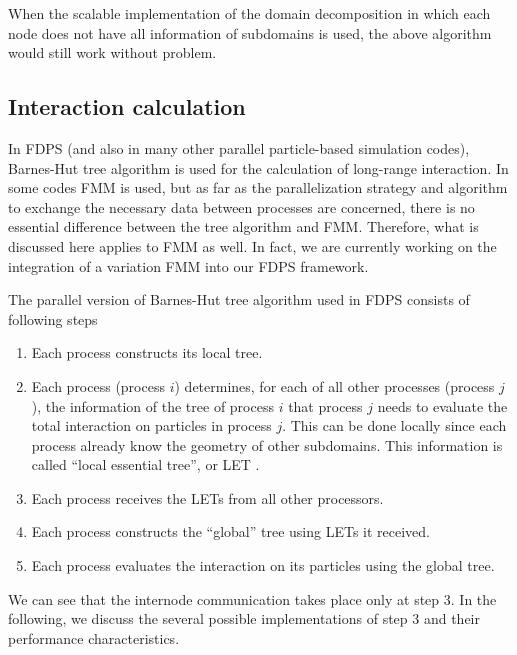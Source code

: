 When the scalable implementation of the domain decomposition in which
each node does not have all information of subdomains is used, the
above algorithm would still work without problem.

\subsection{Interaction calculation}
\label{sect:comm:interaction}

In FDPS (and also in many other parallel particle-based simulation
codes), Barnes-Hut tree algorithm\cite{BarnesHut1986} is used for the
calculation of long-range interaction. In some codes
FMM\cite{GreengardRokhlin1987} is used, but as far as the
parallelization strategy and algorithm to exchange the necessary data
between processes are concerned, there is no essential difference
between the tree algorithm and FMM. Therefore, what is discussed here
applies to FMM as well. In fact, we are currently working on the
integration of a variation FMM into our FDPS framework.

The parallel version of Barnes-Hut tree algorithm used in FDPS
consists of following steps

\begin{enumerate}

\item Each process constructs its local tree.

\item Each process (process $i$) determines, for each of all other
  processes (process $j$),  the information of the tree of  process
  $i$  that process $j$ needs to evaluate the total interaction on particles
  in process $j$. This can be done locally since each process already
  know the geometry of other subdomains. This information is called
  ``local essential tree'', or LET  \cite{WarrenSalmon1992}.

\item Each process receives the LETs from all other processors.

\item Each process constructs the ``global'' tree using LETs it received.

\item Each process evaluates the interaction on its particles using
  the global tree.

\end{enumerate}

We can see that the internode communication takes place only at step
3. In the following, we discuss the several possible implementations
of step 3 and their performance characteristics.

